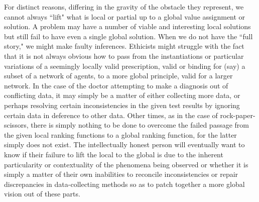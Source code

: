 \documentclass[a4paper]{book}
\theoremstyle{definition}
\theoremstyle{definition}
\theoremstyle{definition}
\theoremstyle{theorem}
\theoremstyle{definition}
\begin{document}
	For distinct reasons, differing in the gravity of the obstacle they represent, we cannot always ``lift" what is local or partial up to a global value assignment or solution. A problem may have a number of viable and interesting local solutions but still fail to have even a single global solution. When we do not have the ``full story," we might make faulty inferences. Ethicists might struggle with the fact that it is not always obvious how to pass from the instantiations or particular variations of a seemingly locally valid prescription, valid or binding for (say) a subset of a network of agents, to a more global principle, valid for a larger network. In the case of the doctor attempting to make a diagnosis out of conflicting data, it may simply be a matter of either collecting more data, or perhaps resolving certain inconsistencies in the given test results by ignoring certain data in deference to other data. Other times, as in the case of rock-paper-scissors, there is simply nothing to be done to overcome the failed passage from the given local ranking functions to a global ranking function, for the latter simply does not exist. The intellectually honest person will eventually want to know if their failure to lift the local to the global is due to the inherent particularity or contextuality of the phenomena being observed or whether it is simply a matter of their own inabilities to reconcile inconsistencies or repair discrepancies in data-collecting methods so as to patch together a more global vision out of these parts. \par 
\end{document}
